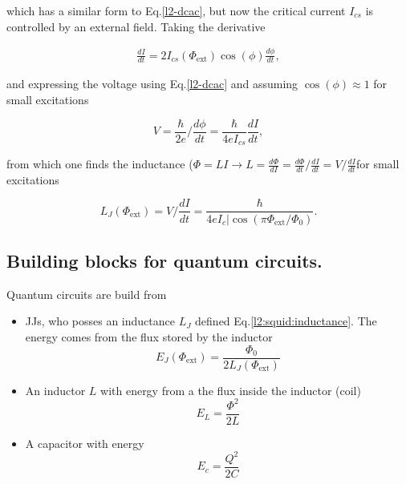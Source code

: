     \noindent which has a similar form to Eq.\eqref{l2-dcac}, but now the critical current $I_{cs}$ is controlled by an external field. Taking the derivative
     
    \begin{equation}
    \begin{aligned}
    	\frac{dI}{dt}=2I_{cs}(\Phi_\text{ext})\cos(\phi)\frac{d\phi}{dt},
    \end{aligned}
    \end{equation}
    
    \noindent and expressing the voltage using Eq.\eqref{l2-dcac} and assuming $\cos(\phi)\approx1$ for small excitations

    \begin{equation}
	    V = \frac{\hbar}{2e}/\frac{d\phi}{dt} = \frac{\hbar}{4eI_{cs}}\frac{dI}{dt},
    \end{equation}
    
    \noindent from which one finds the inductance ($\Phi = LI \rightarrow L = \frac{d\Phi}{dI} = \frac{d\Phi}{dt}/\frac{dI}{dt} = V/\frac{dI}{dt}$for small excitations
    
    \begin{equation}
	    L_J(\Phi_\text{ext}) = V/\frac{dI}{dt} = \frac{\hbar}{4eI_c|\cos(\pi\Phi_\text{ext}/\Phi_0)}.
	    \label{l2:squid:inductance}
	\end{equation}
   \vspace{6ex}
   
   \subsection{Building blocks for quantum circuits.}
    Quantum circuits are build from 
    \begin{itemize}
    	\item JJs, who posses an inductance $L_J$ defined Eq.\eqref{l2:squid:inductance}. The energy comes from the flux stored by the inductor
    	\begin{equation}
    		E_J(\Phi_\text{ext}) = \frac{\Phi_0}{2L_J(\Phi_\text{ext})}
    	\end{equation}
    	\item An inductor $L$ with energy from a the flux inside the inductor (coil)
    	\begin{equation}
    		E_L = \frac{\Phi^2}{2L} 
    	\end{equation}
    	\item A capacitor with energy
    	\begin{equation}
    		E_c = \frac{Q^2}{2C}
    	\end{equation}
    \end{itemize}
   
